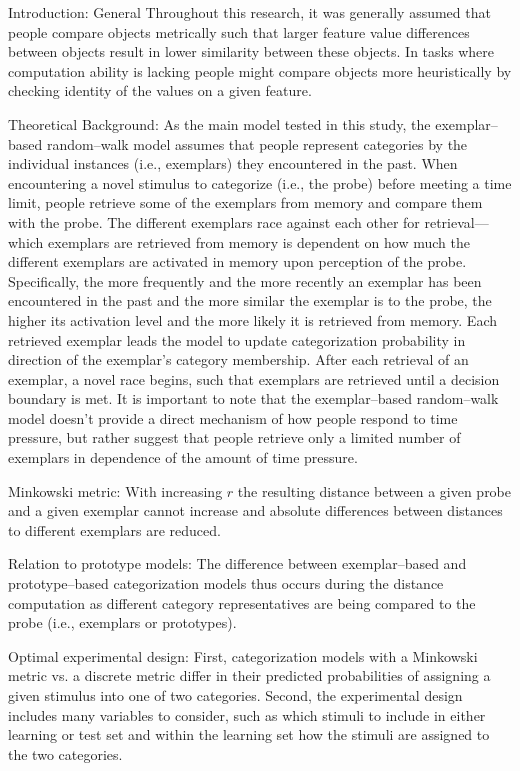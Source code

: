 Introduction: General
Throughout this research, it was generally assumed that people compare objects metrically such that larger feature value differences between objects result in lower similarity between these objects. In tasks where computation ability is lacking people might compare objects more heuristically by checking identity of the values on a given feature. 


Theoretical Background:
As the main model tested in this study, the exemplar--based random--walk model assumes that people represent categories by the individual instances (i.e., exemplars) they encountered in the past. When encountering a novel stimulus to categorize (i.e., the probe) before meeting a time limit, people retrieve some of the exemplars from memory and compare them with the probe. The different exemplars race against each other for retrieval---which exemplars are retrieved from memory is dependent on how much the different exemplars are activated in memory upon perception of the probe. Specifically, the more frequently and the more recently an exemplar has been encountered in the past and the more similar the exemplar is to the probe, the higher its activation level and the more likely it is retrieved from memory. Each retrieved exemplar leads the model to update categorization probability in direction of the exemplar's category membership. After each retrieval of an exemplar, a novel race begins, such that exemplars are retrieved until a decision boundary is met. It is important to note that the exemplar--based random--walk model doesn't provide a direct mechanism of how people respond to time pressure, but rather suggest that people retrieve only a limited number of exemplars in dependence of the amount of time pressure.

Minkowski metric:
With increasing $r$ the resulting distance between a given probe and a given exemplar cannot increase and absolute differences between distances to different exemplars are reduced.

Relation to prototype models:
The difference between exemplar--based and prototype--based categorization models thus occurs during the distance computation as different category representatives are being compared to the probe (i.e., exemplars or prototypes).

Optimal experimental design:
First, categorization models with a Minkowski metric vs. a discrete metric differ in their predicted probabilities of assigning a given stimulus into one of two categories. Second, the experimental design includes many variables to consider, such as which stimuli to include in either learning or test set and within the learning set how the stimuli are assigned to the two categories. 

